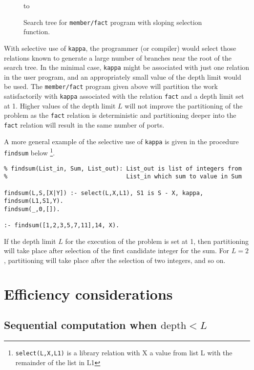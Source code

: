 \begin{figure}[htbp]
\vspace{5mm} \hbox to 
\caption{Search tree for \texttt{member/fact} program with sloping selection function.}
\vspace{5mm}
\label{sloping_ports}
\end{figure}

With selective use of \texttt{kappa}, the programmer (or compiler) would select those
relations known to generate a large number of branches near the root of the search
tree.  In the minimal case, \texttt{kappa} might be associated with just one relation in
the user program, and an appropriately small value of the depth limit would be used.
The \texttt{member/fact} program given above will partition the work satisfactorily with
\texttt{kappa} associated with the relation \texttt{fact} and a depth limit set at 1.
Higher values of the depth limit $L$ will not improve the partitioning of the problem
as the \texttt{fact} relation is deterministic and partitioning deeper into the
\texttt{fact} relation will result in the same number of ports.

A more general example of the selective use of \texttt{kappa} is given in the
procedure \texttt{findsum} below
\footnote{\texttt{select(L,X,L1)} is a library relation with X a value from list L
  with the remainder of the list in L1}. 
\begin{verbatim}
% findsum(List_in, Sum, List_out): List_out is list of integers from
%                                  List_in which sum to value in Sum

findsum(L,S,[X|Y]) :- select(L,X,L1), S1 is S - X, kappa, findsum(L1,S1,Y). 
findsum(_,0,[]).

:- findsum([1,2,3,5,7,11],14, X).
\end{verbatim}
If the depth limit $L$ for the execution of the problem is set at 1, then partitioning will
take place after selection of the first candidate integer for the sum.  For $L=2$,
partitioning will take place after the selection of two integers, and so on.

\section{Efficiency considerations} %

\subsection{Sequential computation when $\mbox{depth}<L$}

